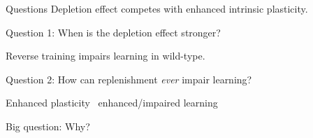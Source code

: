 \documentclass{beamer}%
\newcommand{\w}{\mathbf{w}}
\newcommand{\M}{\mathbf{M}}
\newcommand{\pot}{^{\text{pot}}}
\newcommand{\dep}{^{\text{dep}}}
\begin{document}

\begin{frame}{Questions}
%
 Depletion effect competes with enhanced intrinsic plasticity.

 \vp\alert{Question 1:}  When is the depletion effect stronger?

 \vp\vp Reverse training impairs learning in wild-type.

 \vp\alert{Question 2:} How can replenishment \emph{ever} impair learning?

 \vp\vp Enhanced plasticity \lto\ enhanced/impaired learning

 \vp\alert{Big question:} Why?
%
\end{frame}

%
%
%
%
%
\end{document}
